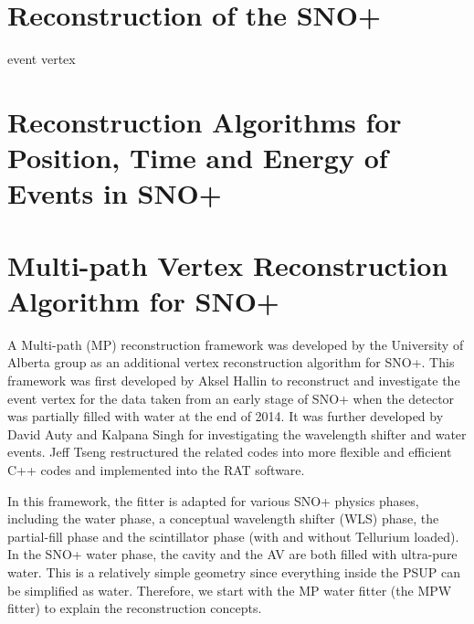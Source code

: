 


\section{Reconstruction of the SNO+}

event vertex



\section{Reconstruction Algorithms for Position, Time and Energy of Events in SNO+}






\section{Multi-path Vertex Reconstruction Algorithm for SNO+}
A Multi-path (MP) reconstruction framework was developed by the University of Alberta group as an additional vertex reconstruction algorithm for SNO+.
This framework was first developed by Aksel Hallin to reconstruct and investigate the event vertex for the data taken from an early stage of SNO+ when the detector was partially filled with water at the end of 2014\cite{partialWater}. It was further developed by David Auty and Kalpana Singh for investigating the wavelength shifter and water events\cite{davidPartialWater, kalpanaWLS, kalpanaWLS2, kalpanaMPFitter}. Jeff Tseng restructured the related codes into more flexible and efficient C++ codes and implemented into the RAT software\cite{jieMPW}.

In this framework, the fitter is adapted for various SNO+ physics phases, including the water phase, a conceptual wavelength shifter (WLS) phase, the partial-fill phase and the scintillator phase (with and without Tellurium loaded). In the SNO+ water phase, the cavity and the AV are both filled with ultra-pure water. This is a relatively simple geometry since everything inside the PSUP can be simplified as water. Therefore, we start with the MP water fitter (the MPW fitter) to explain the reconstruction concepts.

